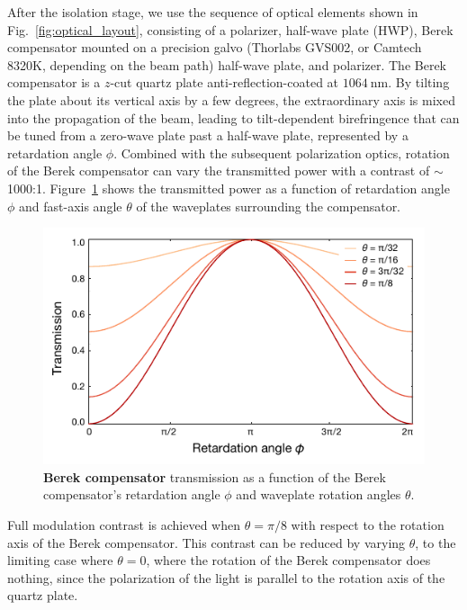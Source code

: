 \documentclass[twocolumn,aps,pra,showpacs,preprintnumbers,bibnotes]{revtex4-1}
\newcommand\unit[2]{\ensuremath{#1~\mathrm{{#2}}}}
\begin{document}
After the isolation stage, we use the sequence of optical elements shown in Fig.~\ref{fig:optical_layout}, consisting of a polarizer, half-wave plate (HWP), Berek compensator mounted on a precision galvo (Thorlabs GVS002, or Camtech 8320K, depending on the beam path) half-wave plate, and polarizer.
The Berek compensator is a $z$-cut quartz plate anti-reflection-coated at \unit{1064}{nm}.
By tilting the plate about its vertical axis by a few degrees, the extraordinary axis is mixed into the propagation of the beam, leading to tilt-dependent birefringence that can be tuned from a zero-wave plate past a half-wave plate, represented by a retardation angle $\phi$.
Combined with the subsequent polarization optics, rotation of the Berek compensator can vary the transmitted power with a contrast of $\sim$1000:1.
Figure~\ref{fig:berek} shows the transmitted power as a function of retardation angle $\phi$ and fast-axis angle $\theta$ of the waveplates surrounding the compensator.
\begin{figure}
  \begin{center}
    \includegraphics{Figure4.pdf}
    \caption{\textbf{Berek compensator} transmission as a function of the Berek compensator's retardation angle $\phi$ and waveplate rotation angles $\theta$.}\label{fig:berek}
  \end{center}
\end{figure}

Full modulation contrast is achieved when $\theta=\pi/8$ with respect to the rotation axis of the Berek compensator.
This contrast can be reduced by varying $\theta$, to the limiting case where $\theta=0$, where the rotation of the Berek compensator does nothing, since the polarization of the light is parallel to the rotation axis of the quartz plate.
\end{document}
